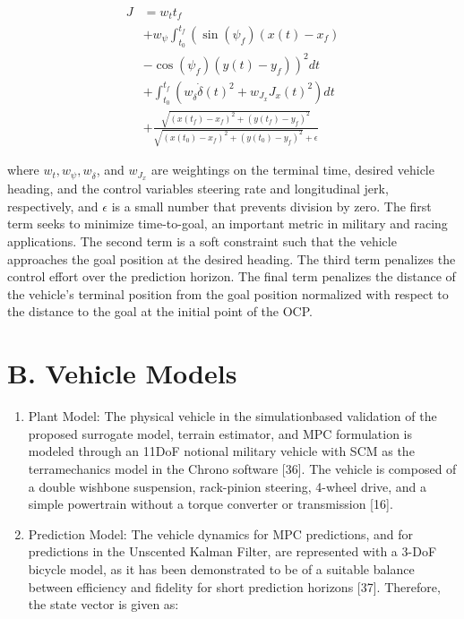 \documentclass[10pt]{article}
\begin{document}
\begin{align*}
J & =w_{t} t_{f} \\
& +w_{\psi} \int_{t_{0}}^{t_{f}}\left(\sin \left(\psi_{f}\right)\left(x(t)-x_{f}\right)\right. \\
& \left.-\cos \left(\psi_{f}\right)\left(y(t)-y_{f}\right)\right)^{2} d t  \tag{11}\\
& +\int_{t_{0}}^{t_{f}}\left(w_{\dot{\delta}} \dot{\delta}(t)^{2}+w_{J_{x}} J_{x}(t)^{2}\right) d t \\
& +\frac{\sqrt{\left(x\left(t_{f}\right)-x_{f}\right)^{2}+\left(y\left(t_{f}\right)-y_{f}\right)^{2}}}{\sqrt{\left(x\left(t_{0}\right)-x_{f}\right)^{2}+\left(y\left(t_{0}\right)-y_{f}\right)^{2}}+\epsilon}
\end{align*}


where $w_{t}, w_{\psi}, w_{\dot{\delta}}$, and $w_{J_{x}}$ are weightings on the terminal time, desired vehicle heading, and the control variables steering rate and longitudinal jerk, respectively, and $\epsilon$ is a small number that prevents division by zero. The first term seeks to minimize time-to-goal, an important metric in military and racing applications. The second term is a soft constraint such that the vehicle approaches the goal position at the desired heading. The third term penalizes the control effort over the prediction horizon. The final term penalizes the distance of the vehicle's terminal position from the goal position normalized with respect to the distance to the goal at the initial point of the OCP.

\section*{B. Vehicle Models}
\begin{enumerate}
  \item Plant Model: The physical vehicle in the simulationbased validation of the proposed surrogate model, terrain estimator, and MPC formulation is modeled through an 11DoF notional military vehicle with SCM as the terramechanics model in the Chrono software [36]. The vehicle is composed of a double wishbone suspension, rack-pinion steering, 4-wheel drive, and a simple powertrain without a torque converter or transmission [16].
  \item Prediction Model: The vehicle dynamics for MPC predictions, and for predictions in the Unscented Kalman Filter, are represented with a 3-DoF bicycle model, as it has been demonstrated to be of a suitable balance between efficiency and fidelity for short prediction horizons [37]. Therefore, the state vector is given as:
\end{enumerate}
\end{document}
